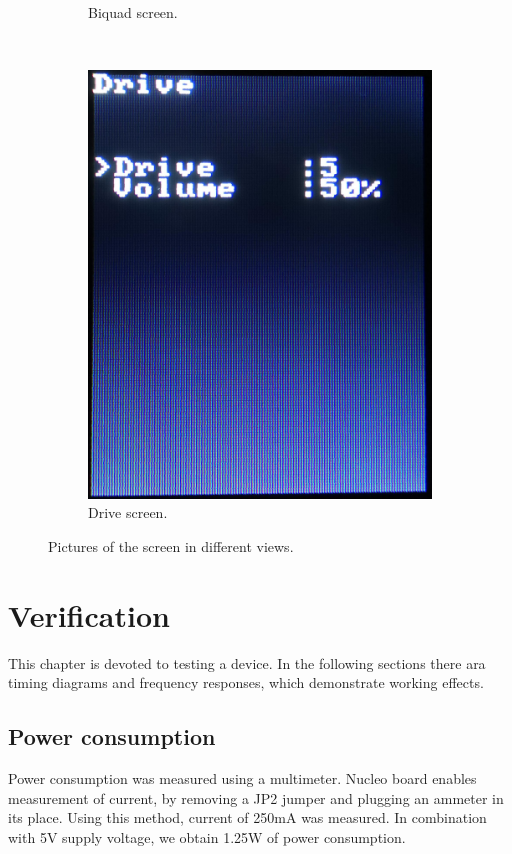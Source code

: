 \documentclass[a4paper,twoside,12pt]{book}
\begin{document}
\begin{figure}[H]
\begin{subfigure}[t]{0.23\textwidth}
        \caption{Biquad screen.}
    \end{subfigure}
    ~
    \begin{subfigure}[t]{0.23\textwidth}
        \includegraphics[width=\textwidth]{images/screen4}
        \caption{Drive screen.}
    \end{subfigure}
    \caption{Pictures of the screen in different views.}
    \label{fig:screens}
\end{figure}

\chapter{Verification}\label{ch:verification}
This chapter is devoted to testing a device.
In the following sections there ara timing diagrams and frequency
responses, which demonstrate working effects.

\section{Power consumption}
Power consumption was measured using a multimeter.
Nucleo board enables measurement of current,
by removing a JP2 jumper and plugging an ammeter in its place\cite{ST:UM2407}.
Using this method, current of 250mA was measured.
In combination with 5V supply voltage,
we obtain 1.25W of power consumption.
\end{document}
